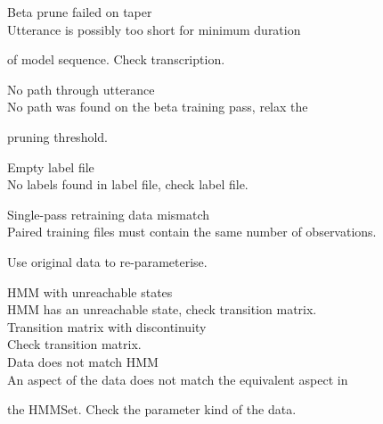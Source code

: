 \begin{itemize}
\begin{itemize}
    Beta prune failed on taper\\


        Utterance is possibly too short for minimum duration


        of model sequence. Check transcription.





    No path through utterance\\


        No path was found on the beta training pass, relax the


        pruning threshold.





    Empty label file\\


        No labels found in label file, check label file.





    Single-pass retraining data mismatch\\


        Paired training files must contain the same number of observations.  


        Use original data to re-parameterise.





  HMM with unreachable states\\


        HMM has an unreachable state, check transition matrix.\\





 Transition matrix with discontinuity\\


        Check transition matrix.\\        





    Data does not match HMM\\


        An aspect of the data does not match the equivalent aspect in 


        the HMMSet.  Check the parameter kind of the data.






\end{itemize}
\end{itemize}
